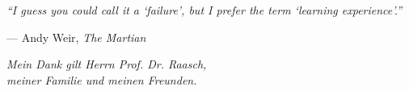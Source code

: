 
\thispagestyle{empty}
\vspace*{0.1\textheight}
\noindent\emph{\enquote{I guess you could call it a \enquote{failure}, but I prefer the term \enquote{learning
experience}.}}\bigbreak

\hfill --- Andy Weir, \textit{The Martian}

\vfill{}
\begin{flushright}
\emph{Mein Dank gilt Herrn Prof. Dr. Raasch, \\meiner Familie und meinen Freunden.}
\end{flushright}
\cleardoublepage
